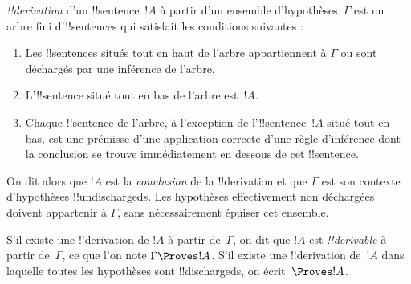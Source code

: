 \documentclass[11pt,a4paper,openany]{memoir}
\begin{document}
\begin{defn}[!!^{derivation}]
 \emph{!!{derivation}} d'un !!{sentence}~$!A$
à partir d'un ensemble d'hypothèses~$\Gamma$ est un arbre fini
d'!!{sentence}s qui satisfait les conditions suivantes :
\begin{enumerate}
\item Les !!{sentence}s situés tout en haut de l'arbre appartiennent
  à $\Gamma$ ou sont déchargés par une inférence de l'arbre.
\item L'!!{sentence} situé tout en bas de l'arbre est~$!A$.
\item Chaque !!{sentence} de l'arbre, à l'exception de
  l'!!{sentence}~$!A$ situé tout en bas, est une prémisse d'une
  application correcte d'une règle d'inférence dont la conclusion
  se trouve immédiatement en dessous de cet !!{sentence}.
\end{enumerate}
On dit alors que $!A$ est la \emph{conclusion} de la !!{derivation}
et que $\Gamma$ est son contexte d'hypothèses !!{undischarged}s.
Les hypothèses effectivement non déchargées doivent appartenir à
$\Gamma$, sans nécessairement épuiser cet ensemble.

S'il existe une !!{derivation} de $!A$ à partir de~$\Gamma$,
on dit que $!A$ est \emph{!!{derivable}} à partir de~$\Gamma$,
ce que l'on note $\Gamma \Proves !A$. S'il existe une
!!{derivation} de~$!A$ dans laquelle toutes les hypothèses sont
!!{discharged}s, on écrit~$\Proves !A$.
\end{defn}
\end{document}

